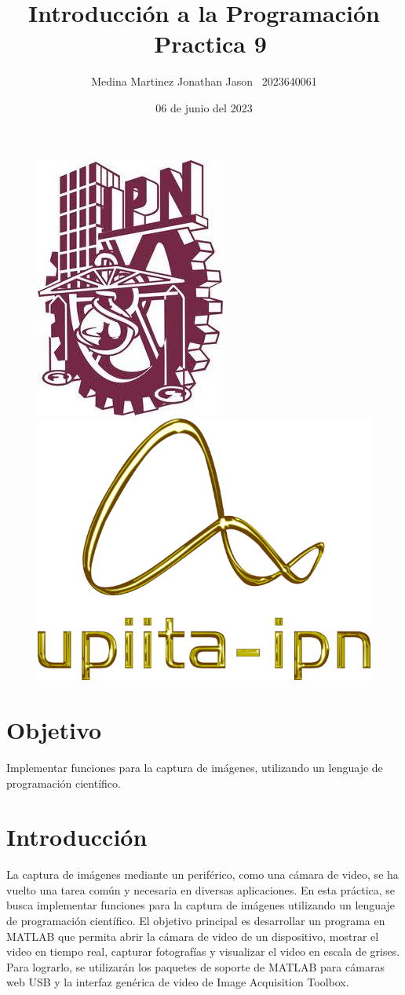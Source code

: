 \documentclass{article}
\title{Introducción a la Programación \ Practica 9}
\author{Medina Martinez Jonathan Jason \ 2023640061}
\date{06 de junio del 2023}
\begin{document}
	
	\fontsize{12}{16}\selectfont
	
	\begin{figure}[t]
		
		\includegraphics[width=2.5 cm]{Logo1.jpeg}
		\hfill
		\includegraphics[width=3 cm]{Logo2.png}
		
	\end{figure}
	
	\maketitle
	\newpage
	
	\tableofcontents
	\newpage
	
	\section{Objetivo}
	
	Implementar funciones para la captura de imágenes, utilizando un lenguaje de programación científico.
	
	\section{Introducción}
	
	La captura de imágenes mediante un periférico, como una cámara de video, se ha vuelto una tarea común y necesaria en diversas aplicaciones. En esta práctica, se busca implementar funciones para la captura de imágenes utilizando un lenguaje de programación científico. El objetivo principal es desarrollar un programa en MATLAB que permita abrir la cámara de video de un dispositivo, mostrar el video en tiempo real, capturar fotografías y visualizar el video en escala de grises. Para lograrlo, se utilizarán los paquetes de soporte de MATLAB para cámaras web USB y la interfaz genérica de video de Image Acquisition Toolbox.
	
\end{document}
